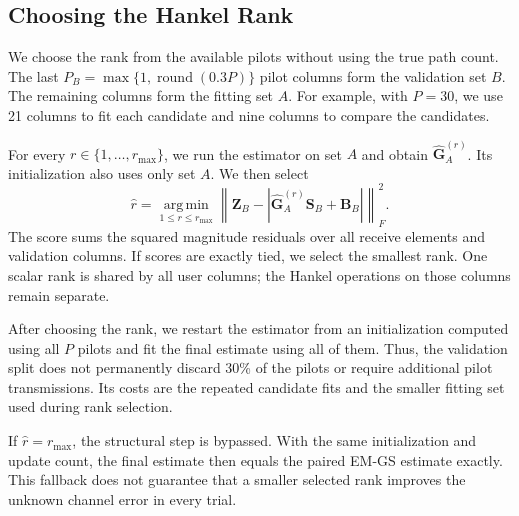 \documentclass[11pt,a4paper]{article}
\begin{document}
\subsection{Choosing the Hankel Rank}
\label{sec:revised-rank-selection}

We choose the rank from the available pilots without using the true path
count. The last $P_B=\max\{1,\operatorname{round}(0.3P)\}$ pilot columns
form the validation set $B$. The remaining columns form the fitting set
$A$. For example, with $P=30$, we use 21 columns to fit each candidate and
nine columns to compare the candidates.

For every $r\in\{1,\ldots,r_{\max}\}$, we run the estimator on set $A$
and obtain $\widehat{\mathbf G}^{(r)}_A$. Its initialization also uses only
set $A$. We then select
\begin{equation}
\widehat r=\operatorname*{arg\,min}_{1\leq r\leq r_{\max}}
\left\|\mathbf Z_B-
 \left|\widehat{\mathbf G}^{(r)}_A\mathbf S_B+\mathbf B_B\right|
\right\|_F^2.
\label{eq:revision-rank-selection}
\end{equation}
The score sums the squared magnitude residuals over all receive elements
and validation columns. If scores are exactly tied, we select the smallest
rank. One scalar rank is shared by all user columns; the Hankel operations
on those columns remain separate.

After choosing the rank, we restart the estimator from an initialization
computed using all $P$ pilots and fit the final estimate using all of them.
Thus, the validation split does not permanently discard 30\% of the pilots
or require additional pilot transmissions. Its costs are the repeated
candidate fits and the smaller fitting set used during rank selection.

If $\widehat r=r_{\max}$, the structural step is bypassed. With the same
initialization and update count, the final estimate then equals the paired
EM-GS estimate exactly. This fallback does not guarantee that a smaller
selected rank improves the unknown channel error in every trial.
\end{document}
